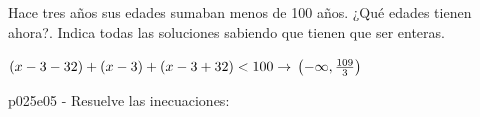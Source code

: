 \documentclass[spanish, 11pt]{exam}
\begin{document}
\begin{questions}
\begin{multicols}{1}
\begin{parts}
    Hace tres años sus edades sumaban menos de 100 años. 
    ¿Qué edades tienen ahora?. Indica todas las soluciones sabiendo que tienen que ser enteras.  \begin{solution}  $ (x-3-32)+(x-3)+(x-3+32)<100  \rightarrow  \\\left(-\infty, \frac{109}{3}\right) $  \end{solution}
        \end{parts}
        \end{multicols}
        \question p025e05 - Resuelve las inecuaciones:
        \begin{multicols}{2} 
        \begin{parts} \part[1]  $ ( {x - 1} )( {x + 2} )( {x 
\end{multicols}
\end{questions}
\end{document}
